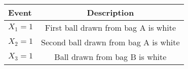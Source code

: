 \begin{tabular}{|l|c|}

\hline
\textbf{Event} & \textbf{Description} \\
\hline
$X_1 = 1$ &  First ball drawn from bag A is white \\
\hline
$X_2 = 1$ &  Second ball drawn from bag A is white \\
\hline
$X_3 = 1$ &  Ball drawn from bag B is white \\
\hline
\end{tabular}
